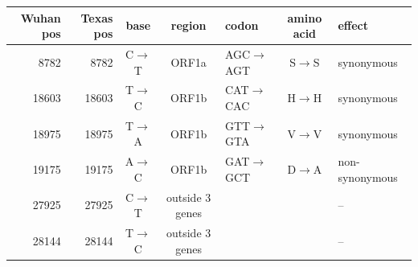 \begin{tabular}{rrcclcl}
\hline
Wuhan pos & Texas pos & base & region & codon & amino acid & effect \\
\hline
8782 & 8782 & C$\to$T & ORF1a & AGC$\to$AGT & S$\to$S & synonymous \\
18603 & 18603 & T$\to$C & ORF1b & CAT$\to$CAC & H$\to$H & synonymous \\
18975 & 18975 & T$\to$A & ORF1b & GTT$\to$GTA & V$\to$V & synonymous \\
19175 & 19175 & A$\to$C & ORF1b & GAT$\to$GCT & D$\to$A & non-synonymous \\
27925 & 27925 & C$\to$T & outside 3 genes &  &  & -- \\
28144 & 28144 & T$\to$C & outside 3 genes &  &  & -- \\
\hline
\end{tabular}